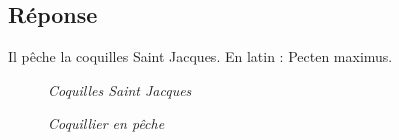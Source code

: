 \documentclass[12pt, report]{article}
\begin{document}
\subsection*{Réponse}
Il pêche la coquilles Saint Jacques. En latin : Pecten maximus.
\begin{center}
\begin{figure}[ht]
\caption{\textit{Coquilles Saint Jacques}}
\end{figure}
\end{center}
\begin{center}
\begin{figure}[ht]
\caption{\textit{Coquillier en pêche}}
\end{figure}
\end{center}
\end{document}

